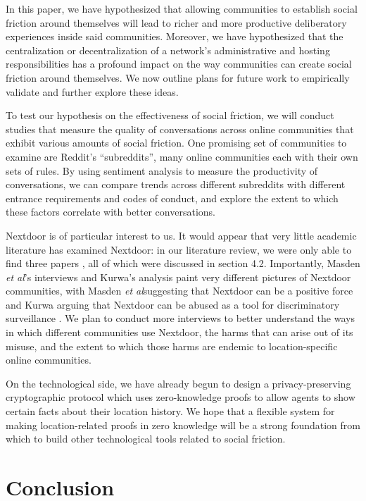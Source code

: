 \documentclass[sigconf,authordraft]{acmart}
\newcommand{\etal}{{\itshape et al}}
\begin{document}
In this paper, we have hypothesized that allowing communities to establish social friction around themselves will lead to richer and more productive deliberatory experiences inside said communities. Moreover, we have hypothesized that the centralization or decentralization of a network's administrative and hosting responsibilities has a profound impact on the way communities can create social friction around themselves. We now outline plans for future work to empirically validate and further explore these ideas.

To test our hypothesis on the effectiveness of social friction, we will conduct studies that measure the quality of conversations across online communities that exhibit various amounts of social friction. One promising set of communities to examine are Reddit's ``subreddits'', many online communities each with their own sets of rules. By using sentiment analysis to measure the productivity of conversations, we can compare trends across different subreddits with different entrance requirements and codes of conduct, and explore the extent to which these factors correlate with better conversations.

Nextdoor is of particular interest to us. It would appear that very little academic literature has examined Nextdoor: in our literature review, we were only able to find three papers \cite{masden2014tensions, kurwa2019building, payne2017welcome}, all of which were discussed in section 4.2. Importantly, Masden \etal's interviews and Kurwa's analysis paint very different pictures of Nextdoor communities, with Masden \etal suggesting that Nextdoor can be a positive force \cite{masden2014tensions} and Kurwa arguing that Nextdoor can be abused as a tool for discriminatory surveillance \cite{kurwa2019building}. We plan to conduct more interviews to better understand the ways in which different communities use Nextdoor, the harms that can arise out of its misuse, and the extent to which those harms are endemic to location-specific online communities.

On the technological side, we have already begun to design a privacy-preserving cryptographic protocol which uses zero-knowledge proofs \cite{goldreich1991proofs} to allow agents to show certain facts about their location history. We hope that a flexible system for making location-related proofs in zero knowledge will be a strong foundation from which to build other technological tools related to social friction.


\section{Conclusion}
\end{document}

